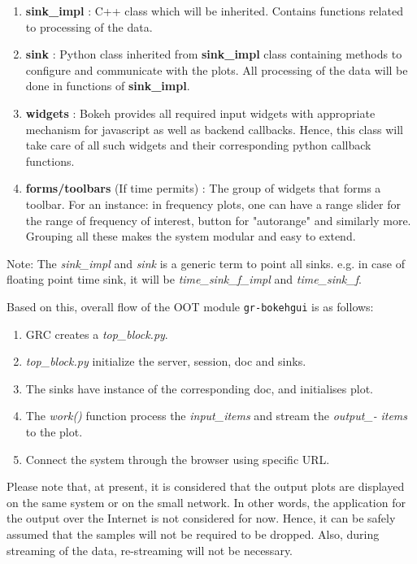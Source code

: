 \documentclass[a4paper, 11pt]{article}
\begin{document}
\begin{enumerate}
\item \textbf{sink\_impl} : C++ class which will be inherited. Contains functions related to processing of the data.
\item \textbf{sink }: Python class inherited from \textbf{sink\_impl }class containing methods to configure and communicate with the plots. All processing of the data will be done in functions of \textbf{sink\_impl}.
\item \textbf{widgets }: Bokeh provides all required input widgets with appropriate mechanism for javascript as well as backend callbacks. Hence, this class will take care of all such widgets and their corresponding python callback functions.
\item \textbf{forms/toolbars} (If time permits) : The group of widgets that forms a toolbar. For an instance: in frequency plots, one can have a range slider for the range of frequency of interest, button for "autorange" and similarly more. Grouping all these makes the system modular and easy to extend.
\end{enumerate}

Note: The \textit{sink\_impl }and \textit{sink }is a generic term to point all sinks. e.g. in case of floating point time sink, it will be \textit{time\_sink\_f\_impl }and \textit{time\_sink\_f}.

Based on this, overall flow of the OOT module \texttt{gr-bokehgui} is as follows:
\begin{enumerate}
\item GRC creates a \textit{top\_block.py}.
\item \textit{top\_block.py }initialize the server, session, doc and sinks.
\item The sinks have instance of the corresponding doc, and initialises plot.
\item The \textit{work()} function process the \textit{input\_items} and stream the \textit{output\_- }\textit{items} to the plot.
\item Connect the system through the browser using specific URL.
\end{enumerate}

Please note that, at present, it is considered that the output plots are displayed on the same system or on the small network. In other words, the application for the output over the Internet is not considered for now. Hence, it can be safely assumed that the samples will not be required to be dropped. Also, during streaming of the data, re-streaming will not be necessary.
\end{document}

